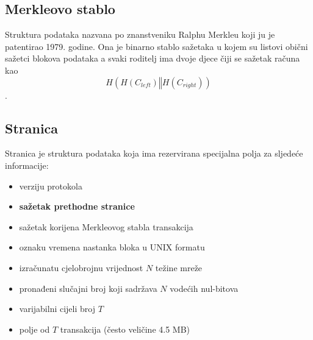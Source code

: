 \documentclass[utf8, zavrsni]{fer}
\begin{document}
\subsection{Merkleovo stablo}
Struktura podataka nazvana po znanstveniku Ralphu Merkleu koji ju je patentirao 1979. godine. Ona je binarno stablo sažetaka u kojem su listovi obični sažetci blokova podataka a svaki roditelj ima dvoje djece čiji se sažetak računa kao $$ H(H(C_{left}) \mathbin\Vert H(C_{right})) $$.
\subsection{Stranica}
Stranica je struktura podataka koja ima rezervirana specijalna polja za sljedeće informacije:
\begin{itemize}
    \item verziju protokola
    \item \textbf{sažetak prethodne stranice}
    \item sažetak korijena Merkleovog stabla transakcija
    \item oznaku vremena nastanka bloka u UNIX formatu
    \item izračunatu cjelobrojnu vrijednost $ N $ težine mreže
    \item pronađeni slučajni broj koji sadržava $ N $ vodećih nul-bitova
    \item varijabilni cijeli broj $ T $
    \item polje od $ T $ transakcija (često veličine 4.5 MB)
\end{itemize}

\end{document}
